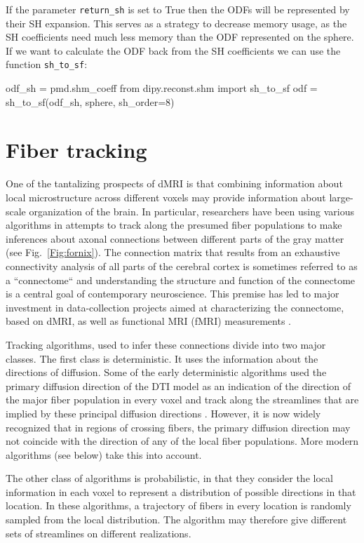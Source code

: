 \documentclass{bioinfo}
\begin{document}
If the parameter \texttt{return\_sh} is set to True then the ODFs will be
represented by their SH expansion. This serves as a strategy to decrease
memory usage, as the SH coefficients need much less memory than the ODF represented
on the sphere. If we want to calculate the ODF back from the SH coefficients we
can use the function \texttt{sh\_to\_sf}:
\begin{python}
odf_sh = pmd.shm_coeff
from dipy.reconst.shm import sh_to_sf
odf = sh_to_sf(odf_sh, sphere, sh_order=8)
\end{python}

\section{Fiber tracking}\label{fiber_tracking}
One of the tantalizing prospects of dMRI is that combining
information about local microstructure across different voxels may provide
information about large-scale organization of the brain. In particular,
researchers have been using various algorithms in attempts to track along the
presumed fiber populations to make inferences about axonal connections between
different parts of the gray matter (see Fig.~\ref{Fig:fornix}). The connection matrix that results from an
exhaustive connectivity analysis of all parts of the cerebral cortex is
sometimes referred to as a ``connectome`` \citep{sporns2005} and understanding
the structure and function of the connectome is a central goal of contemporary
neuroscience. This premise has led to major investment in data-collection
projects aimed at characterizing the connectome, based on dMRI, as well as
functional MRI (fMRI) measurements \citep{VanEssen2013}.

Tracking algorithms, used to infer these connections divide into two major
classes. The first class is deterministic. It uses the information about the
directions of diffusion. Some of the early deterministic algorithms used the
primary diffusion direction of the DTI model as an indication of the direction
of the major fiber population in every voxel and track along the streamlines
that are implied by these principal diffusion directions \citep{Mori1999,
  conturo-lori-etal:99, basser-pajevic-etal:00} . However, it is
now widely recognized that in regions of crossing fibers, the primary diffusion
direction may not coincide with the direction of any of the local fiber
populations. More modern algorithms (see below) take this into account.

The other class of algorithms is probabilistic, in that they consider the local
information in each voxel to represent a distribution of possible directions in
that location. In these algorithms, a trajectory of fibers in every location is
randomly sampled from the local distribution. The algorithm may therefore give
different sets of streamlines on different realizations.
\end{document}
